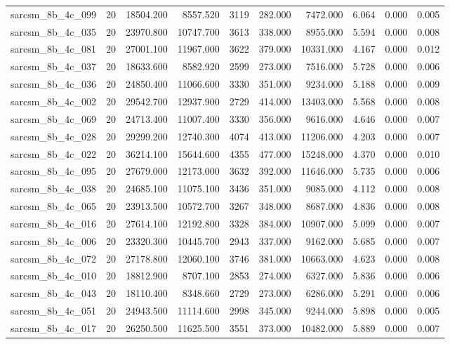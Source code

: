 \begin{tabular}{lrrrrrrrrr}
sarcsm\_8b\_4c\_099 & 20 & 18504.200 & 8557.520 & 3119 & 282.000 & 7472.000 & 6.064 & 0.000 & 0.005 \\
sarcsm\_8b\_4c\_035 & 20 & 23970.800 & 10747.700 & 3613 & 338.000 & 8955.000 & 5.594 & 0.000 & 0.008 \\
sarcsm\_8b\_4c\_081 & 20 & 27001.100 & 11967.000 & 3622 & 379.000 & 10331.000 & 4.167 & 0.000 & 0.012 \\
sarcsm\_8b\_4c\_037 & 20 & 18633.600 & 8582.920 & 2599 & 273.000 & 7516.000 & 5.728 & 0.000 & 0.006 \\
sarcsm\_8b\_4c\_036 & 20 & 24850.400 & 11066.600 & 3330 & 351.000 & 9234.000 & 5.188 & 0.000 & 0.009 \\
sarcsm\_8b\_4c\_002 & 20 & 29542.700 & 12937.900 & 2729 & 414.000 & 13403.000 & 5.568 & 0.000 & 0.008 \\
sarcsm\_8b\_4c\_069 & 20 & 24713.400 & 11007.400 & 3330 & 356.000 & 9616.000 & 4.646 & 0.000 & 0.007 \\
sarcsm\_8b\_4c\_028 & 20 & 29299.200 & 12740.300 & 4074 & 413.000 & 11206.000 & 4.203 & 0.000 & 0.007 \\
sarcsm\_8b\_4c\_022 & 20 & 36214.100 & 15644.600 & 4355 & 477.000 & 15248.000 & 4.370 & 0.000 & 0.010 \\
sarcsm\_8b\_4c\_095 & 20 & 27679.000 & 12173.000 & 3632 & 392.000 & 11646.000 & 5.735 & 0.000 & 0.006 \\
sarcsm\_8b\_4c\_038 & 20 & 24685.100 & 11075.100 & 3436 & 351.000 & 9085.000 & 4.112 & 0.000 & 0.008 \\
sarcsm\_8b\_4c\_065 & 20 & 23913.500 & 10572.700 & 3267 & 348.000 & 8687.000 & 4.836 & 0.000 & 0.008 \\
sarcsm\_8b\_4c\_016 & 20 & 27614.100 & 12192.800 & 3328 & 384.000 & 10907.000 & 5.099 & 0.000 & 0.007 \\
sarcsm\_8b\_4c\_006 & 20 & 23320.300 & 10445.700 & 2943 & 337.000 & 9162.000 & 5.685 & 0.000 & 0.007 \\
sarcsm\_8b\_4c\_072 & 20 & 27178.800 & 12060.100 & 3746 & 381.000 & 10663.000 & 4.623 & 0.000 & 0.008 \\
sarcsm\_8b\_4c\_010 & 20 & 18812.900 & 8707.100 & 2853 & 274.000 & 6327.000 & 5.836 & 0.000 & 0.006 \\
sarcsm\_8b\_4c\_043 & 20 & 18110.400 & 8348.660 & 2729 & 273.000 & 6286.000 & 5.291 & 0.000 & 0.006 \\
sarcsm\_8b\_4c\_051 & 20 & 24943.500 & 11114.600 & 2998 & 345.000 & 9244.000 & 5.898 & 0.000 & 0.005 \\
sarcsm\_8b\_4c\_017 & 20 & 26250.500 & 11625.500 & 3551 & 373.000 & 10482.000 & 5.889 & 0.000 & 0.007 \\

\end{tabular}
